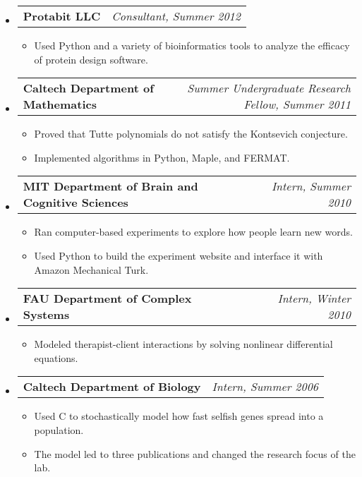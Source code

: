 \documentclass[letterpaper,11pt]{article}
\makeatletter
\newcommand{\resitem}[1]{\item #1 \vspace{-2pt}}
\newcommand{\ressubheading}[4]{
\begin{tabular*}{7.0in}{l@{\extracolsep{\fill}}r}
		\textbf{#1} & \textit{#4} \\
\end{tabular*}\vspace{-6pt}}
\makeatother
\begin{document}
\begin{itemize}


\item
	\ressubheading{Protabit LLC}{Pasadena, CA}{Consultant}{Consultant, Summer 2012}
	\begin{itemize}
		\resitem{Used Python and a variety of bioinformatics tools to analyze the efficacy of protein design software.}
	\end{itemize}
	

	
\item
	\ressubheading{Caltech Department of Mathematics}{Pasadena, CA}{Summer Undergraduate Research Fellow}{Summer Undergraduate Research Fellow, Summer 2011}
	\begin{itemize}
		\resitem{Proved that Tutte polynomials do not satisfy the Kontsevich conjecture.}
		\resitem{Implemented algorithms in Python, Maple, and FERMAT.}
	\end{itemize}
	
\item
	\ressubheading{MIT Department of Brain and Cognitive Sciences}{Cambridge, MA}{Research Intern}{Intern, Summer 2010}
	\begin{itemize}
		\resitem{Ran computer-based experiments to explore how people learn new words.}
		\resitem{Used Python to build the experiment website and interface it with Amazon Mechanical Turk.}
	\end{itemize}

\item
	\ressubheading{FAU Department of Complex Systems}{Boca Raton, FL}{Research Intern}{Intern, Winter 2010}
	\begin{itemize}
		\resitem{Modeled therapist-client interactions by solving nonlinear differential equations.}
	\end{itemize}

\item
	\ressubheading{Caltech Department of Biology}{Pasadena, CA}{Research Intern}{Intern, Summer 2006}
	\begin{itemize}
		\resitem{Used C to stochastically model how fast selfish genes spread into a population.}
		\resitem{The model led to three publications and changed the research focus of the lab.}
	\end{itemize}

\end{itemize}
\end{document}
